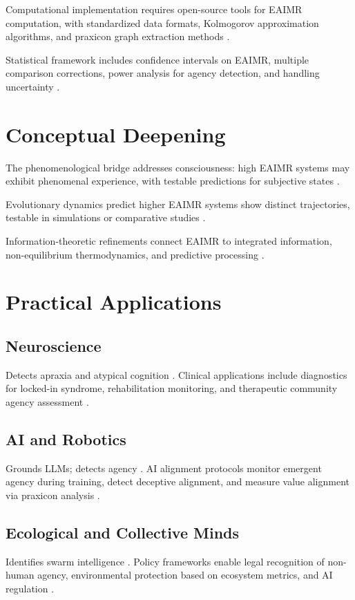 \documentclass{article}
\begin{document}
Computational implementation requires open-source tools for EAIMR computation, with standardized data formats, Kolmogorov approximation algorithms, and praxicon graph extraction methods \citep{kolmogorov1965three}.

Statistical framework includes confidence intervals on EAIMR, multiple comparison corrections, power analysis for agency detection, and handling uncertainty \citep{jaynes2003probability}.

\section{Conceptual Deepening}
\label{sec:conceptual}

The phenomenological bridge addresses consciousness: high EAIMR systems may exhibit phenomenal experience, with testable predictions for subjective states \citep{tononi2004information}.

Evolutionary dynamics predict higher EAIMR systems show distinct trajectories, testable in simulations or comparative studies \citep{camazine2001self}.

Information-theoretic refinements connect EAIMR to integrated information, non-equilibrium thermodynamics, and predictive processing \citep{friston2010free}.

\section{Practical Applications}
\label{sec:applications}

\subsection{Neuroscience}
Detects apraxia and atypical cognition \citep{peigneux2004imaging, zeman2015}. Clinical applications include diagnostics for locked-in syndrome, rehabilitation monitoring, and therapeutic community agency assessment \citep{levin2022technological}.

\subsection{AI and Robotics}
Grounds LLMs; detects agency \citep{pastra2011praxicon, anderson2007how}. AI alignment protocols monitor emergent agency during training, detect deceptive alignment, and measure value alignment via praxicon analysis \citep{yudkowsky2008artificial}.

\subsection{Ecological and Collective Minds}
Identifies swarm intelligence \citep{camazine2001self, simondon2017mode}. Policy frameworks enable legal recognition of non-human agency, environmental protection based on ecosystem metrics, and AI regulation \citep{bostrom2014superintelligence}.
\end{document}

